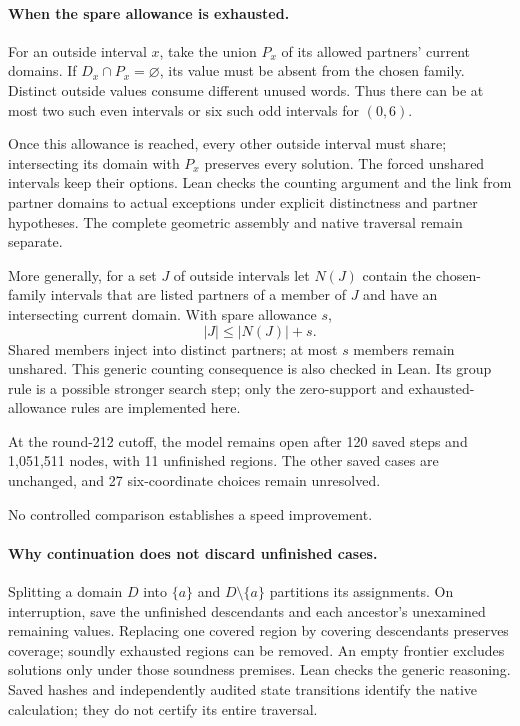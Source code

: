\documentclass[11pt,a4paper]{article}
\begin{document}
\paragraph{When the spare allowance is exhausted.}
For an outside interval $x$, take the union $P_x$ of its allowed
partners' current domains. If $D_x\cap P_x=\varnothing$, its value must
be absent from the chosen family. Distinct outside values consume
different unused words. Thus there can be at most two such even
intervals or six such odd intervals for $(0,6)$.

Once this allowance is reached, every other outside interval must
share; intersecting its domain with $P_x$ preserves every solution.
The forced unshared intervals keep their options. Lean checks the
counting argument and the link from partner domains to actual
exceptions under explicit distinctness and partner hypotheses.
The complete geometric assembly and native traversal remain separate.

More generally, for a set $J$ of outside intervals let $N(J)$ contain
the chosen-family intervals that are listed partners of a member of
$J$ and have an intersecting current domain. With spare allowance $s$,
\[
|J|\le |N(J)|+s.
\]
Shared members inject into distinct partners; at most $s$ members
remain unshared. This generic counting consequence is also checked in
Lean. Its group rule is a possible stronger search step; only the
zero-support and exhausted-allowance rules are implemented here.

At the round-212 cutoff, the model remains open after 120 saved
steps and 1,051,511 nodes, with 11 unfinished regions.
The other saved cases are unchanged, and 27 six-coordinate choices
remain unresolved.


No controlled comparison establishes a speed improvement.

\paragraph{Why continuation does not discard unfinished cases.}
Splitting a domain $D$ into $\{a\}$ and $D\setminus\{a\}$ partitions its
assignments. On interruption, save the unfinished descendants and
each ancestor's unexamined remaining values. Replacing one covered
region by covering descendants preserves coverage; soundly exhausted
regions can be removed. An empty frontier excludes solutions only
under those soundness premises. Lean checks the generic reasoning.
Saved hashes and independently audited state transitions identify
the native calculation; they do not certify its entire traversal.
\end{document}
